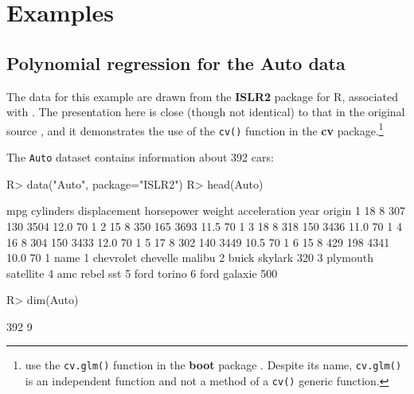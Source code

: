 \documentclass[
]{jss}
\begin{document}
\hypertarget{examples}{%
\section{Examples}\label{examples}}

\hypertarget{polynomial-regression-for-the-auto-data}{%
\subsection{Polynomial regression for the Auto
data}\label{polynomial-regression-for-the-auto-data}}

The data for this example are drawn from the \textbf{ISLR2} package for
R, associated with \citet{JamesEtAl:2021}. The presentation here is
close (though not identical) to that in the original source \citep[
Secs. 5.1, 5.3]{JamesEtAl:2021}, and it demonstrates the use of the
\texttt{cv()} function in the \textbf{cv} package.\footnote{\citet{JamesEtAl:2021}
  use the \texttt{cv.glm()} function in the \textbf{boot} package
  \citep{CantyRipley2022, DavisonHinkley:1997}. Despite its name,
  \texttt{cv.glm()} is an independent function and not a method of a
  \texttt{cv()} generic function.}

The \texttt{Auto} dataset contains information about 392 cars:

\begin{CodeChunk}
\begin{CodeInput}
R> data("Auto", package="ISLR2")
R> head(Auto)
\end{CodeInput}
\begin{CodeOutput}
  mpg cylinders displacement horsepower weight acceleration year origin
1  18         8          307        130   3504         12.0   70      1
2  15         8          350        165   3693         11.5   70      1
3  18         8          318        150   3436         11.0   70      1
4  16         8          304        150   3433         12.0   70      1
5  17         8          302        140   3449         10.5   70      1
6  15         8          429        198   4341         10.0   70      1
                       name
1 chevrolet chevelle malibu
2         buick skylark 320
3        plymouth satellite
4             amc rebel sst
5               ford torino
6          ford galaxie 500
\end{CodeOutput}
\begin{CodeInput}
R> dim(Auto)
\end{CodeInput}
\begin{CodeOutput}
[1] 392   9
\end{CodeOutput}
\end{CodeChunk}
\end{document}
